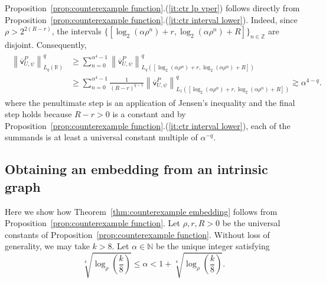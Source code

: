\documentclass[11pt,reqno]{amsart}
\newcommand{\N}{\mathbb{N}}
\newcommand{\R}{\mathbb{R}}
\newcommand{\Z}{\mathbb{Z}}
\newcommand{\0}{\mathbf{0}}
\renewcommand{\1}{\mathbf 1}
\renewcommand{\ge}{\geqslant}
\renewcommand{\le}{\leqslant}
\theoremstyle{remark}
\newcommand{\vpP}[1]{{\overline{\mathsf{v}}^{P}_{\!#1}}}
\begin{document}
 Proposition~\ref{prop:counterexample function}.(\ref{it:ctr lp vper}) follows directly from Proposition~\ref{prop:counterexample function}.(\ref{it:ctr interval lower}). Indeed, since $\rho>2^{2(R-r)}$, the intervals $\{[\log_2(\alpha\rho^{n})+r,\log_2(\alpha\rho^{n})+R]\}_{n\in \Z}$ are disjoint. Consequently,
\begin{align}\label{eq:4 from 3}
\begin{split}
\left\|\vpP{U,\psi}\right\|_{L_q(\R)}^q&\ge \sum_{n=0}^{\alpha^4-1}  \left\|\vpP{U,\psi}\right\|_{L_q([\log_2(\alpha\rho^{n})+r,\log_2(\alpha\rho^{n})+R])}^q\\&\ge \sum_{n=0}^{\alpha^4-1}  \frac{1}{(R-r)^{q-1}}\left\|\vpP{U,\psi}\right\|_{L_1([\log_2(\alpha\rho^{n})+r,\log_2(\alpha\rho^{n})+R])}^q\gtrsim \alpha^{4-q}.
\end{split}
\end{align}
where the penultimate step is an application of Jensen's inequality and the final step holds because $R-r>0$ is a constant and by Proposition~\ref{prop:counterexample function}.(\ref{it:ctr interval lower}), each of the summands is at least a universal constant multiple of $\alpha^{-q}$.

\subsection{Obtaining an embedding from an intrinsic graph}\label{sec:proof of ctr embedding} Here we show how Theorem~\ref{thm:counterexample embedding} follows from Proposition~\ref{prop:counterexample function}.
Let $\rho,r, R>0$ be the universal constants of Proposition~\ref{prop:counterexample function}. Without loss of generality, we may take $k> 8$.  Let $\alpha\in \N$ be the unique integer satisfying
\begin{equation}\label{eq:alpha choice}
\sqrt[4]{\log_\rho \left(\frac{k}{8}\right)}\le \alpha <1+\sqrt[4]{\log_\rho \left(\frac{k}{8}\right)}.
\end{equation}
\end{document}
